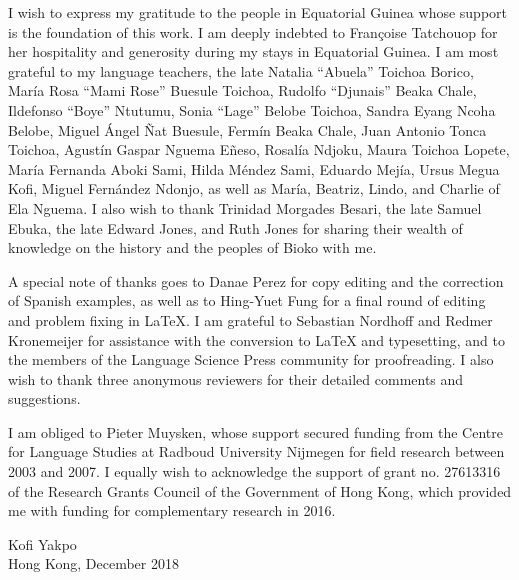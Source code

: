
I wish to express my gratitude to the people in Equatorial Guinea whose support is the foundation of this work. I am deeply indebted to Françoise Tatchouop for her hospitality and generosity during my stays in Equatorial Guinea. I am most grateful to my language teachers, the late Natalia “Abuela” Toichoa Borico, María Rosa “Mami Rose” Buesule Toichoa, Rudolfo “Djunais” Beaka Chale, Ildefonso “Boye” Ntutumu, Sonia “Lage” Belobe Toichoa, Sandra Eyang Ncoha Belobe, Miguel Ángel Ñat Buesule, Fermín Beaka Chale, Juan Antonio Tonca Toichoa, Agustín Gaspar Nguema Eñeso, Rosalía Ndjoku, Maura Toichoa Lopete, María Fernanda Aboki Sami, Hilda Méndez Sami, Eduardo Mejía, Ursus Megua Kofi, Miguel Fernández Ndonjo, as well as María, Beatriz, Lindo, and Charlie of Ela Nguema. I also wish to thank Trinidad Morgades Besari, the late Samuel Ebuka, the late Edward Jones, and Ruth Jones for sharing their wealth of knowledge on the history and the peoples of Bioko with me.


A special note of thanks goes to Danae Perez for copy editing and the correction of Spanish examples, as well as to Hing-Yuet Fung for a final round of editing and problem fixing in LaTeX. I am grateful to Sebastian Nordhoff and Redmer Kronemeijer for assistance with the conversion to LaTeX and typesetting, and to the members of the Language Science Press community for proofreading. I also wish to thank three anonymous reviewers for their detailed comments and suggestions.


I am obliged to Pieter Muysken, whose support secured funding from the Centre for Language Studies at Radboud University Nijmegen for field research between 2003 and 2007. I equally wish to acknowledge the support of grant no. 27613316 of the Research Grants Council of the Government of Hong Kong, which provided me with funding for complementary research in 2016.

{\raggedleft
Kofi Yakpo\\
Hong Kong, {December 2018} \par
}

